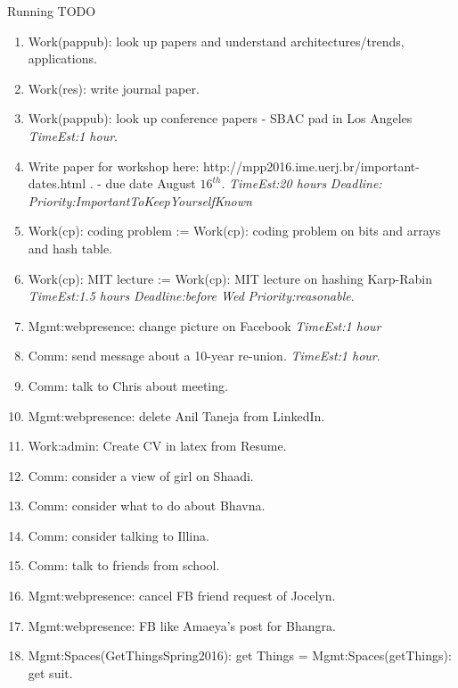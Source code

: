 \documentclass[serif, mathserif, final]{beamer}
\newcommand{\te}[1]{\textit{TimeEst:}\textit{#1}}
\newcommand{\dl}[1]{\textit{Deadline:}\textit{#1}}
\newcommand{\pr}[1]{\textit{Priority:}\textit{#1}}
\begin{document}
\begin{frame}
\begin{columns}
\begin{column}{0.5\linewidth}
\begin{block}{Running TODO}
\begin{enumerate}
        \item \tiny Work(pappub): look up papers and understand
          architectures/trends, applications.  
        \item \tiny Work(res): write journal paper. 
        \item \tiny Work(pappub): look up conference papers - SBAC pad in Los
          Angeles \te{1 hour}. 
        \item \tiny  Write paper for workshop here: http://mpp2016.ime.uerj.br/important-dates.html
          . - due date August $16^{th}$.  \te{20 hours} \dl{    }
          \pr{ImportantToKeepYourselfKnown}  
        \item \tiny Work(cp): coding problem := Work(cp): coding
          problem on bits and arrays and hash table. 
        \item \tiny Work(cp): MIT lecture := Work(cp): MIT lecture on
          hashing Karp-Rabin \te{1.5 hours} \dl{before Wed}
          \pr{reasonable}. 

        \item \tiny Mgmt:webpresence: change picture on Facebook \te{1
          hour} 
        \item \tiny Comm: send message about a 10-year
          re-union. \te{1 hour}. 
        \item \tiny Comm: talk to Chris about meeting.  


        \item \tiny Mgmt:webpresence: delete Anil Taneja from
          LinkedIn. 
        \item \tiny Work:admin: Create CV in latex from Resume.   



        \item \tiny Comm: consider a view of girl on Shaadi. 
        \item \tiny Comm: consider what to do about Bhavna. 
        \item \tiny Comm: consider talking to Illina. 
        \item \tiny Comm: talk to friends from school. 

        \item \tiny Mgmt:webpresence: cancel FB friend request of
          Jocelyn.  
        \item \tiny Mgmt:webpresence: FB like Amaeya's post for
          Bhangra. 
        \item \tiny Mgmt:Spaces(GetThingsSpring2016): get Things =
          Mgmt:Spaces(getThings): get suit. 
        \end{enumerate}
      \end{block}


\end{column}
\end{columns}
\end{frame}
\end{document}
